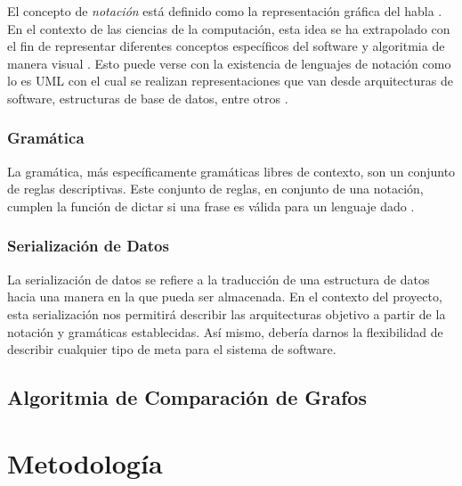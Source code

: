 \documentclass[12pt]{article}
\begin{document}
    El concepto de \textit{notación} está definido como la representación gráfica del habla \cite{crystal2011dictionary}. En el contexto de las ciencias de la computación, esta idea se ha extrapolado con el fin de representar diferentes conceptos específicos del software y algoritmia de manera visual \cite{RutanenKalle2018McoO}. Esto puede verse con la existencia de lenguajes de notación como lo es UML con el cual se realizan representaciones que van desde arquitecturas de software, estructuras de base de datos, entre otros \cite{Booch2005-xu}.
    
    \subsubsection{Gramática}


    La gramática, más específicamente gramáticas libres de contexto, son un conjunto de reglas descriptivas. Este conjunto de reglas, en conjunto de una notación, cumplen la función de dictar si una frase es válida para un lenguaje dado \cite[p. 101]{Sipser2012-wl}. 

    

    \subsubsection{Serialización de Datos}


    La serialización de datos se refiere a la traducción de una estructura de datos hacia una manera en la que pueda ser almacenada. En el contexto del proyecto, esta serialización nos permitirá describir las arquitecturas objetivo a partir de la notación y gramáticas establecidas. Así mismo, debería darnos la flexibilidad de describir cualquier tipo de meta para el sistema de software.
    

    \subsection{Algoritmia de Comparación de Grafos} %



    \pagebreak

    \section{Metodología}
\end{document}

